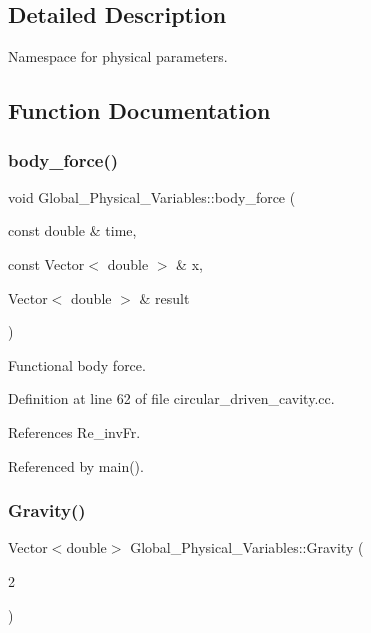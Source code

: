 \subsection{Detailed Description}
Namespace for physical parameters. 

\subsection{Function Documentation}
\mbox{\label{namespaceGlobal__Physical__Variables_a87da705b8a46bed337cf5dbdd788b87b}} 
\subsubsection{\texorpdfstring{body\+\_\+force()}{body\_force()}}
{\footnotesize\ttfamily void Global\+\_\+\+Physical\+\_\+\+Variables\+::body\+\_\+force (\begin{DoxyParamCaption}\item[{const double \&}]{time,  }\item[{const Vector$<$ double $>$ \&}]{x,  }\item[{Vector$<$ double $>$ \&}]{result }\end{DoxyParamCaption})}



Functional body force. 



Definition at line 62 of file circular\+\_\+driven\+\_\+cavity.\+cc.



References Re\+\_\+inv\+Fr.



Referenced by main().

\mbox{\label{namespaceGlobal__Physical__Variables_afae321364975eb56688ad13abc8ed6b7}} 
\subsubsection{\texorpdfstring{Gravity()}{Gravity()}}
{\footnotesize\ttfamily Vector$<$double$>$ Global\+\_\+\+Physical\+\_\+\+Variables\+::\+Gravity (\begin{DoxyParamCaption}\item[{2}]{ }\end{DoxyParamCaption})}



